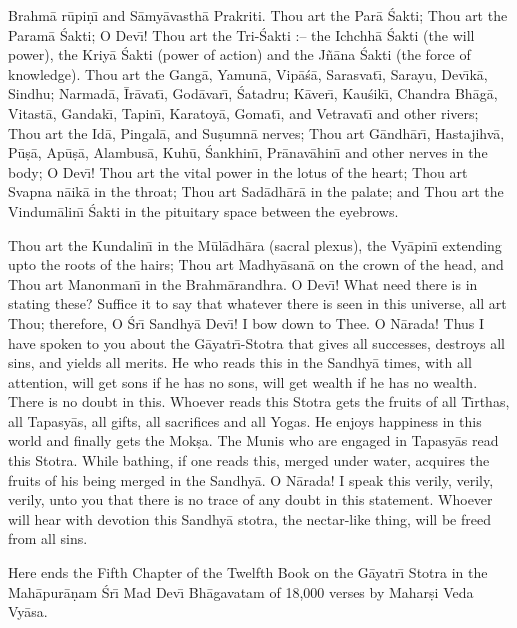 Brahm\=a r\=upi\d{n}\={\i} and S\=amy\=avasth\=a Prakriti. Thou art the Par\=a \'Sakti; Thou art the Param\=a \'Sakti; O Dev\={\i}! Thou art the Tri-\'Sakti :-- the Ichchh\=a \'Sakti (the will power), the Kriy\=a \'Sakti (power of action) and the J\~n\=ana \'Sakti (the force of knowledge). Thou art the Gang\=a, Yamun\=a, Vip\=a\'s\=a, Sarasvat\={\i}, Sarayu, Dev\={\i}k\=a, Sindhu; Narmad\=a, \=Ir\=avat\={\i}, God\=avar\={\i}, \'Satadru; K\=aver\={\i}, Kau\'sik\={\i}, Chandra Bh\=ag\=a, Vitast\=a, Gandak\={\i}, Tapin\={\i}, Karatoy\=a, Gomat\={\i}, and Vetravat\={\i} and other rivers; Thou art the Id\=a, Pingal\=a, and Su\d{s}umn\=a nerves; Thou art G\=andh\=ar\={\i}, Hastajihv\=a, P\=u\d{s}\=a, Ap\=u\d{s}\=a, Alambus\=a, Kuh\=u, \'Sankhin\={\i}, Pr\=anav\=ahin\={\i} and other nerves in the body; O Dev\={\i}! Thou art the vital power in the lotus of the heart; Thou art Svapna n\=aik\=a in the throat; Thou art Sad\=adh\=ar\=a in the palate; and Thou art the Vindum\=alin\={\i} \'Sakti in the pituitary space between the eyebrows.

Thou art the Kundalin\={\i} in the M\=ul\=adh\=ara (sacral plexus), the Vy\=apin\={\i} extending upto the roots of the hairs; Thou art Madhy\=asan\=a on the crown of the head, and Thou art Manonman\={\i} in the Brahm\=arandhra. O Dev\={\i}! What need there is in stating these? Suffice it to say that whatever there is seen in this universe, all art Thou; therefore, O \'Sr\={\i} Sandhy\=a Dev\={\i}! I bow down to Thee. O N\=arada! Thus I have spoken to you about the G\=ayatr\={\i}-Stotra that gives all successes, destroys all sins, and yields all merits. He who reads this in the Sandhy\=a times, with all attention, will get sons if he has no sons, will get wealth if he has no wealth. There is no doubt in this. Whoever reads this Stotra gets the fruits of all T\={\i}rthas, all Tapasy\=as, all gifts, all sacrifices and all Yogas. He enjoys happiness in this world and finally gets the Mok\d{s}a. The Munis who are engaged in Tapasy\=as read this Stotra. While bathing, if one reads this, merged under water, acquires the fruits of his being merged in the Sandhy\=a. O N\=arada! I speak this verily, verily, verily, unto you that there is no trace of any doubt in this statement. Whoever will hear with devotion this Sandhy\=a stotra, the nectar-like thing, will be freed from all sins.

Here ends the Fifth Chapter of the Twelfth Book on the G\=ayatr\={\i} Stotra in the Mah\=apur\=a\d{n}am \'Sr\={\i} Mad Dev\={\i} Bh\=agavatam of 18,000 verses by Mahar\d{s}i Veda Vy\=asa.



